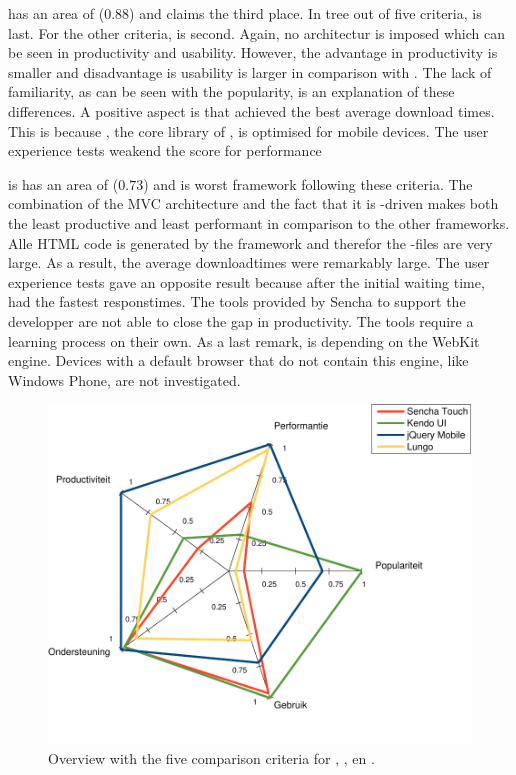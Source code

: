 \documentclass[a4paper]{artikel3}
\begin{document}
\lungo{} has an area of ($0.88$) and claims the third place.
In tree out of five criteria,  \lungo{} is last.
For the other criteria,  \lungo{} is second.
Again, no architectur is imposed which can be seen in productivity and usability.
However,  the advantage in productivity is smaller and disadvantage is usability is larger in comparison with \jqma{}.
The lack of familiarity,  as can be seen with the popularity,  is an explanation of these differences.
A positive aspect is that \lungo{} achieved the best average download times.  
This is because \quo{},  the core library of \lungo{},  is optimised for mobile devices.
The user experience tests weakend the score for performance


\sta {} is has an area of ($0.73$) and is worst framework following these criteria.
The combination of the MVC architecture and the fact that it is \js-driven makes \sta{} both the least productive and least performant in comparison to the other frameworks.
Alle HTML code is generated by the framework and therefor the \js-files are very large.
As a result,  the average downloadtimes were remarkably large.
The user experience tests gave an opposite result because after the initial waiting time,  \sta{} had the fastest responstimes.
The tools provided by Sencha to support the developper are not able to close the gap in productivity.
The tools require a learning process on their own.
As a last remark,  \sta{} is depending on the WebKit engine.
Devices with a default browser that do not contain this engine,  like Windows Phone, are not investigated.

\begin{figure}
  \centering
  \includegraphics[width=\columnwidth]{../Masterproef/figuren/spidergraph-final.pdf}
  \caption{Overview with the five comparison criteria for \sta{},  \kendob{},  \jqma{} en \lungo{}.}
  \label{fig:spidergraph}
\end{figure}
\end{document}
